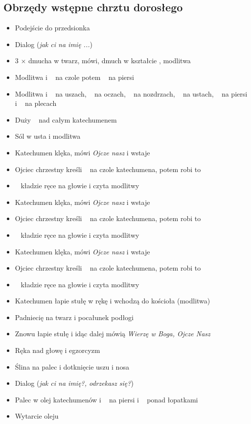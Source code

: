\subsection{Obrzędy wstępne chrztu dorosłego}
\label{sec:chrzest}
\begin{itemize}
      \item Podejście do przedsionka
      \item Dialog (\textit{jak ci na imię ...})
      \item 3 $\times$ dmucha w twarz, mówi, dmuch w kształcie \krzyz, modlitwa
      \item Modlitwa i \krzyz~ na czole potem \krzyz~ na piersi
      \item Modlitwa i \krzyz\krzyz~ na uszach, \krzyz\krzyz~ na oczach,
            \krzyz\krzyz~ na nozdrzach, \krzyz~ na ustach, \krzyz~ na piersi i
            \krzyz~ na plecach
      \item Duży \krzyz~ nad całym katechumenem
      \item Sól w usta i modlitwa
      \item Katechumen klęka, mówi \textit{Ojcze nasz} i wstaje
      \item Ojciec chrzestny kreśli \krzyz~ na czole katechumena, potem robi to
            \ii
      \item \ii~ kładzie ręce na głowie i czyta modlitwy
      \item Katechumen klęka, mówi \textit{Ojcze nasz} i wstaje
      \item Ojciec chrzestny kreśli \krzyz~ na czole katechumena, potem robi to
            \ii
      \item \ii~ kładzie ręce na głowie i czyta modlitwy
      \item Katechumen klęka, mówi \textit{Ojcze nasz} i wstaje
      \item Ojciec chrzestny kreśli \krzyz~ na czole katechumena, potem robi to
            \ii
      \item \ii~ kładzie ręce na głowie i czyta modlitwy
      \item Katechumen łapie stułę w rękę i wchodzą do kościoła (modlitwa)
      \item Padniecię na twarz i pocałunek podłogi
      \item Znowu łapie stułę i idąc dalej mówią \textit{Wierzę w Boga, Ojcze Nasz}
      \item Ręka nad głowę i egzorcyzm
      \item Ślina na palec i dotknięcie uszu i nosa
      \item Dialog (\textit{jak ci na imię?, odrzekasz się?})
      \item Palec w olej katechumenów i \krzyz~ na piersi i \krzyz~ ponad
            łopatkami
      \item Wytarcie oleju
\end{itemize}

